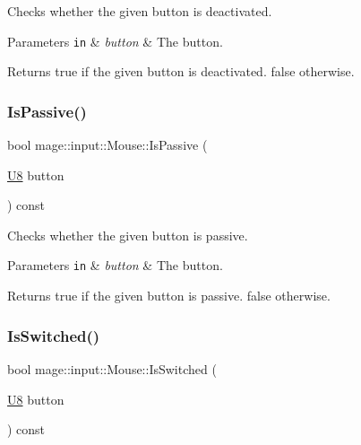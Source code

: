 Checks whether the given button is deactivated.


\begin{DoxyParams}[1]{Parameters}
\mbox{\tt in}  & {\em button} & The button. \\
\hline
\end{DoxyParams}
\begin{DoxyReturn}{Returns}
{\ttfamily true} if the given button is deactivated. {\ttfamily false} otherwise. 
\end{DoxyReturn}
\mbox{\label{classmage_1_1input_1_1_mouse_a32bcee1d744d90b06841ad5b77d6c17d}} 
\subsubsection{\texorpdfstring{Is\+Passive()}{IsPassive()}}
{\footnotesize\ttfamily bool mage\+::input\+::\+Mouse\+::\+Is\+Passive (\begin{DoxyParamCaption}\item[{\mbox{\hyperlink{namespacemage_a30677c03d683c4c35630c25f6ff3fb7f}{U8}}}]{button }\end{DoxyParamCaption}) const\hspace{0.3cm}{\ttfamily [noexcept]}}

Checks whether the given button is passive.


\begin{DoxyParams}[1]{Parameters}
\mbox{\tt in}  & {\em button} & The button. \\
\hline
\end{DoxyParams}
\begin{DoxyReturn}{Returns}
{\ttfamily true} if the given button is passive. {\ttfamily false} otherwise. 
\end{DoxyReturn}
\mbox{\label{classmage_1_1input_1_1_mouse_af38182b04326b6885df7f7cdc09a44e6}} 
\subsubsection{\texorpdfstring{Is\+Switched()}{IsSwitched()}}
{\footnotesize\ttfamily bool mage\+::input\+::\+Mouse\+::\+Is\+Switched (\begin{DoxyParamCaption}\item[{\mbox{\hyperlink{namespacemage_a30677c03d683c4c35630c25f6ff3fb7f}{U8}}}]{button }\end{DoxyParamCaption}) const\hspace{0.3cm}{\ttfamily [noexcept]}}

